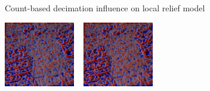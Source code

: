 \documentclass[xcolor={dvipsnames,usenames},beamer,aspectratio=169]{beamer}
\begin{document}
\begin{frame}{Count-based decimation influence on local relief model}

\newcommand{\imgsize}{0.23\textwidth}

\centering
\includegraphics[width=\imgsize]{uav_all_lrm_shaded}%
~%
\includegraphics[width=\imgsize]{uav_skip_5_lrm_shaded}%

\end{frame}
\end{document}
